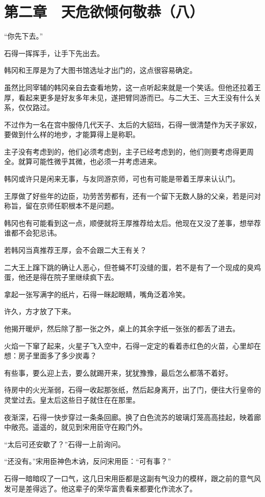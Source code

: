 \section{第二章　天危欲倾何敬恭（八）}

“你先下去。”

石得一挥挥手，让手下先出去。

韩冈和王厚是为了大图书馆选址才出门的，这点很容易确定。

虽然比同宰辅的韩冈亲自去查看地势，这一点听起来就是一个笑话。但他还拉着王厚，看起来更多是好友多年未见，遂把臂同游而已。与二大王、三大王没有什么关系，仅仅路过。

不过作为一名在宫中服侍几代天子、太后的大貂珰，石得一很清楚作为天子家奴，要做到什么样的地步，才能算得上是称职。

主子没有考虑到的，他们必须考虑到，主子已经考虑到的，他们则要考虑得更周全。就算可能性微乎其微，也必须一并考虑进来。

韩冈或许只是闲来无事，与友同游京师，可也有可能是带着王厚来认认门。

王厚做了好些年的边臣，功劳苦劳都有，还有一个留下无数人脉的父亲，若是问对称旨，留在京师任职根本不是问题。

韩冈也有可能看到这一点，顺便就将王厚推荐给太后。他现在又没了差事，想举荐谁都不会犯忌讳。

若韩冈当真推荐王厚，会不会跟二大王有关？

二大王上蹿下跳的确让人恶心，但苍蝇不叮没缝的蛋，若不是有了一个现成的臭鸡蛋，他还是得在院子里继续疯下去。

拿起一张写满字的纸片，石得一眯起眼睛，嘴角泛着冷笑。

许久，方才放了下来。

他揭开暖炉，然后除了那一张之外，桌上的其余字纸一张张的都丢了进去。

火焰一下窜了起来，火星子飞入空中，石得一定定的看着赤红色的火苗，心里却在想：房子里面多了多少炭毒？

有些事，要么迎上去，要么就踢开来，犹犹豫豫，最后怎么都落不着好。

待房中的火光渐弱，石得一收起那张纸，然后起身离开，出了门，便往大行皇帝的灵堂过去。皇太后这些日子就住在在那里。

夜渐深，石得一快步穿过一条条回廊。换了白色流苏的玻璃灯笼高高挂起，映着廊中敞亮。遥遥的，就见到宋用臣守在殿门外。

“太后可还安歇了？”石得一上前询问。

“还没有。”宋用臣神色木讷，反问宋用臣：“可有事？”

石得一暗暗叹了一口气，这几日宋用臣都是这副有气没力的模样，跟之前的意气风发可是差得远了。他这辈子的荣华富贵看来都要化作流水了。

